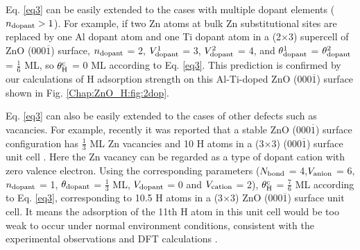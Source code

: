 Eq. \ref{eq3} can be easily extended to the cases with multiple dopant elements ($n_{\textup{dopant}} > 1$). For example, if two Zn atoms at bulk Zn substitutional sites are replaced by one Al dopant atom and one Ti dopant atom in a (2$\times$3) supercell of ZnO (000$\overline{1}$) surface, $n_{\textup{dopant}}$ = 2,  $V_{\textup{dopant}}^1$ = 3, $V_{\textup{dopant}}^2$ = 4, and $\theta_{\textup{dopant}}^1$ = $\theta_{\textup{dopant}}^2$ = $\frac{1}{6}$ ML,  so $\theta_{\textup{H}}^{\textup{c}}$ = 0 ML according to Eq. \ref{eq3}. This prediction is confirmed by our calculations of H adsorption strength on this Al-Ti-doped ZnO (000$\overline{1}$) surface shown in Fig. \ref{Chap:ZnO_H:fig:2dop}. 

Eq. \ref{eq3} can also be easily extended to the cases of other defects such as vacancies. For example, recently it was reported that a stable ZnO (000$\overline{1}$) surface configuration has $\frac{1}{3}$ ML Zn vacancies and 10 H atoms in a (3$\times$3) (000$\overline{1}$) surface unit cell \cite{Jacobs16ZnO}. Here the Zn vacancy can be regarded as a type of dopant cation with zero valence electron. Using the corresponding parameters ($N_{\textup{bond}}$ = 4,$V_{\textup{anion}}$ = 6, $n_{\textup{dopant}}$ = 1, $\theta_{\textup{dopant}}$ = $\frac{1}{3}$ ML, $V_{\textup{dopant}}$ = 0 and $V_{\textup{cation}}$ = 2), $\theta_{\textup{H}}^{\textup{c}}$ = $\frac{7}{6}$ ML according to Eq. \ref{eq3}, corresponding to 10.5 H atoms in a (3$\times$3) ZnO (000$\overline{1}$) surface unit cell. It means the adsorption of the 11th H atom in this unit cell would be too weak to occur under normal environment conditions, consistent with the experimental observations and \ac{DFT} calculations \cite{Jacobs16ZnO}.

